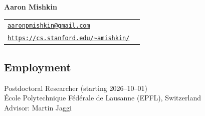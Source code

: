 
\titlespacing*{\section}{0pt}{2.0ex}{2.0ex}
\titlespacing*{\subsection}{0pt}{2.0ex}{2.0ex}

{\large\textbf{Aaron Mishkin}}
\hfill
\begin{tabular}{ll}
    \normalsize \href{mailto:aaronpmishkin@gmail.com}{\texttt{aaronpmishkin@gmail.com}} \\[-.25em]
    \normalsize \href{https://cs.stanford.edu/~amishkin/}{\texttt{https://cs.stanford.edu/{\textasciitilde}amishkin/}}
\end{tabular}

\newenvironment{fourtable}{%
    \begin{tabular}{p{.15\textwidth}p{.445\textwidth}p{.145\textwidth}p{.15\textwidth}}%
}{%
    \end{tabular}%
}

\newenvironment{threetable}{%
    \begin{tabular}{p{.62\textwidth}p{.145\textwidth}p{.155\textwidth}}%
}{%
    \end{tabular}%
}
\newenvironment{threetableother}{%
    \begin{tabular}{p{.205\textwidth}p{.56\textwidth}p{.14\textwidth}}%
}{%
    \end{tabular}%
}
\newenvironment{twotable}{%
    \begin{tabular}{p{.205\textwidth}p{.72\textwidth}}%
}{%
    \end{tabular}%
}

\vspace{2ex}
\subsection{Employment}

\begin{description}[leftmargin=\mleftsize,style=nextline,font=\normalfont\space]
    Postdoctoral Researcher \hfill (starting 2026--10--01)\\
    École Polytechnique Fédérale de Lausanne (EPFL), Switzerland\\
    Advisor: Martin Jaggi
\end{description}

